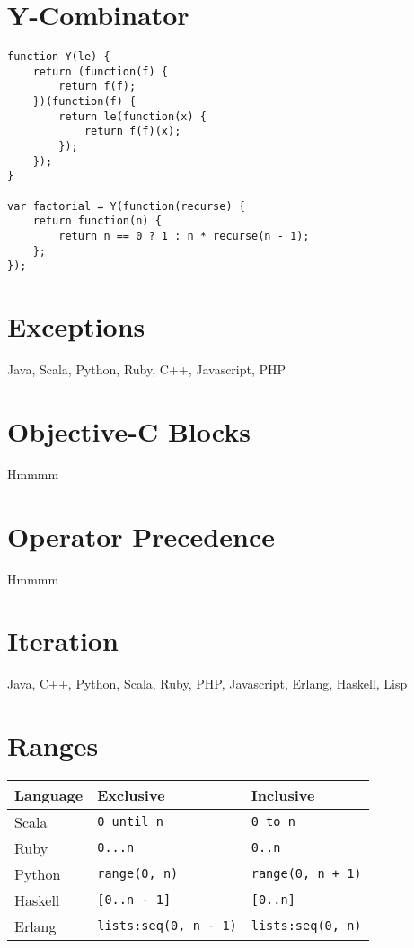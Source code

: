 \documentclass{article}
\begin{document}
\section{Y-Combinator}
\begin{lstlisting}
function Y(le) {
    return (function(f) {
        return f(f);
    })(function(f) {
        return le(function(x) {
            return f(f)(x);
        });
    });
}

var factorial = Y(function(recurse) {
    return function(n) {
        return n == 0 ? 1 : n * recurse(n - 1);
    };
});
\end{lstlisting}

\section{Exceptions}
Java, Scala, Python, Ruby, C++, Javascript, PHP

\section{Objective-C Blocks}
Hmmmm

\section{Operator Precedence}
Hmmmm

\section{Iteration}
Java, C++, Python, Scala, Ruby, PHP, Javascript, Erlang, Haskell, Lisp

\section{Ranges}
\begin{longtabu} to 0.75\linewidth { X X X }
	Language & Exclusive & Inclusive \\
	\hline
	Scala & \lstinline$0 until n$ & \lstinline$0 to n$ \\
	Ruby & \lstinline$0...n$ & \lstinline$0..n$ \\
	Python & \lstinline$range(0, n)$ & \lstinline$range(0, n + 1)$ \\
	Haskell & \lstinline$[0..n - 1]$ & \lstinline$[0..n]$ \\
	Erlang & \lstinline$lists:seq(0, n - 1)$ & \lstinline$lists:seq(0, n)$ \\
\end{longtabu}
\end{document}
